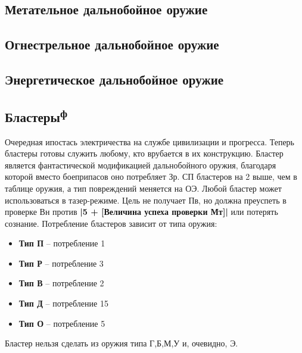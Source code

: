 
\newpage
\subsection{Метательное дальнобойное оружие}

\newpage
\subsection{Огнестрельное дальнобойное оружие}

\newpage
\subsection{Энергетическое дальнобойное оружие}

\newpage
\subsection{Бластеры\textsuperscript{ф}}
Очередная ипостась электричества на службе цивилизации и прогресса. Теперь бластеры готовы служить любому, кто врубается в их конструкцию.
\newline Бластер является фантастической модификацией дальнобойного оружия, благодаря которой вместо боеприпасов оно потребляет Зр. СП бластеров на 2 выше, чем в таблице оружия, а тип повреждений меняется на ОЭ.
Любой бластер может использоваться в тазер-режиме. Цель не получает Пв, но должна преуспеть в проверке Вн против \textbf{|5 + [Величина успеха проверки Мт]|} или потерять сознание.
Потребление бластеров зависит от типа оружия:
\begin{itemize}
\item \textbf{Тип П} -- потребление 1
\item \textbf{Тип Р} -- потребление 3
\item \textbf{Тип В} -- потребление 2
\item \textbf{Тип Д} -- потребление 15
\item \textbf{Тип О} -- потребление 5
\end{itemize}
Бластер нельзя сделать из оружия типа Г,Б,М,У и, очевидно, Э.%

\printindex[weapons]



